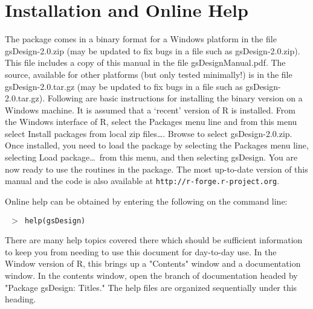 \section{Installation and Online Help\label{sec:install}}

The package comes in a binary format for a Windows platform in the file
gsDesign-2.0.zip (may be updated to fix bugs in a file such as
gsDesign-2.0.zip). This file includes a copy of this manual in the file
gsDesignManual.pdf. The source, available for other platforms (but only tested
minimally!) is in the file gsDesign-2.0.tar.gz (may be updated to fix bugs in
a file such as gsDesign-2.0.tar.gz). Following are basic instructions for
installing the binary version on a Windows machine. It is assumed that a
`recent' version of R is installed. From the Windows interface of R, select
the Packages menu line and from this menu select Install packages from local
zip files\ldots. Browse to select gsDesign-2.0.zip. Once installed, you need
to load the package by selecting the Packages menu line, selecting Load
package\ldots\ from this menu, and then selecting gsDesign. You are now ready
to use the routines in the package. The most up-to-date version of this manual
and the code is also available at \texttt{http://r-forge.r-project.org}.

\bigskip

Online help can be obtained by entering the following on the command line:

\bigskip

\texttt{%
$>$
help(gsDesign)}

\bigskip

There are many help topics covered there which should be sufficient
information to keep you from needing to use this document for day-to-day use.
In the Window version of R, this brings up a "Contents" window and a
documentation window. In the contents window, open the branch of documentation
headed by "Package gsDesign: Titles." The help files are organized
sequentially under this heading. 

